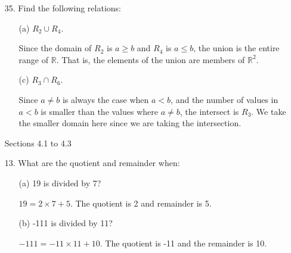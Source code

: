 \documentclass[12pt]{article}
\newcommand\bufsub{\vspace{1.0in}}
\newenvironment{answer}{\larger[2]}{}
\begin{document}
\begin{enumerate}
\item[35.] Find the following relations:

\begin{enumerate}
    \item[(a)] $R_2 \cup R_4$.
    
    \begin{answer}
        Since the domain of $R_2$ is $a \geq b$ and $R_4$ is $a \leq b$, the union is the entire range of $\mathbb{R}$. That is, the elements of the union are members of $\mathbb{R}^2$.
    \end{answer}
    
    \item[(c)] $R_3 \cap R_6$.
    
    \begin{answer}
        Since $a \neq b$ is always the case when $a < b$, and the number of values in $a < b$ is smaller than the values where $a \neq b$, the intersect is $R_3$. We take the smaller domain here since we are taking the intersection. 
    \end{answer}
    
\end{enumerate}

\newpage

\begin{center}
    {\large Sections 4.1 to 4.3}
\end{center}



\item[13.]  What are the quotient and remainder when:

\begin{enumerate}
    \item[(a)] 19 is divided by 7?
    
    \begin{answer}
        $19 = 2 \times 7 + 5$. The quotient is 2 and remainder is 5.
    \end{answer}
    
    \vspace{0.2in}

    \item[(b)] -111 is divided by 11?
    
    \begin{answer}
        $-111 = -11 \times 11 + 10$. The quotient is -11 and the remainder is 10.
    \end{answer}
    
\end{enumerate}
\bufsub


\end{enumerate}
\end{document}
